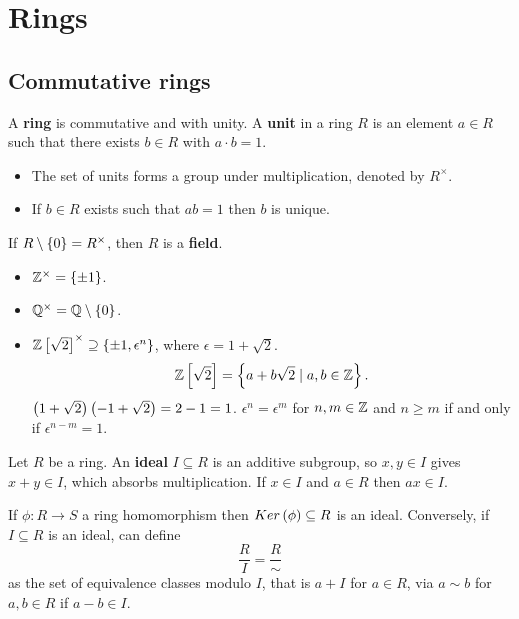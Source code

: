\pagebreak

\section{Rings}


\subsection{Commutative rings}

\begin{definition}
A \textbf{ring} is commutative and with unity. A \textbf{unit} in a ring $ R $ is an element $ a \in R $ such that there exists $ b \in R $ with $ a \cdot b = 1 $.
\begin{itemize}
\item The set of units forms a group under multiplication, denoted by $ R^\times $.
\item If $ b \in R $ exists such that $ ab = 1 $ then $ b $ is unique.
\end{itemize}
If $ R \setminus \left\{ 0 \right\} = R^\times $, then $ R $ is a \textbf{field}.
\end{definition}

\begin{example*}
\hfill
\begin{itemize}
\item $ \mathbb{Z}^\times = \left\{ \pm 1 \right\} $.
\item $ \mathbb{Q}^\times = \mathbb{Q} \setminus \left\{ 0 \right\} $.
\item $ \mathbb{Z}\left[ \sqrt{2} \right]^\times \supseteq \left\{ \pm 1, \epsilon^n \right\} $, where $ \epsilon = 1 + \sqrt{2} $.
$$ \mathbb{Z}\left[ \sqrt{2} \right] = \left\{ a + b\sqrt{2} \mid a, b \in \mathbb{Z} \right\}. $$
$ \left( 1 + \sqrt{2} \right)\left( -1 + \sqrt{2} \right) = 2 - 1 = 1 $. $ \epsilon^n = \epsilon^m $ for $ n, m \in \mathbb{Z} $ and $ n \ge m $ if and only if $ \epsilon^{n - m} = 1 $.
\end{itemize}
\end{example*}

\begin{definition}
Let $ R $ be a ring. An \textbf{ideal} $ I \subseteq R $ is an additive subgroup, so $ x, y \in I $ gives $ x + y \in I $, which absorbs multiplication. If $ x \in I $ and $ a \in R $ then $ ax \in I $.
\end{definition}

\begin{fact*}
If $ \phi : R \to S $ a ring homomorphism then $ Ker\left( \phi \right) \subseteq R $ is an ideal. Conversely, if $ I \subseteq R $ is an ideal, can define
$$ \dfrac{R}{I} = \dfrac{R}{\sim} $$
as the set of equivalence classes modulo $ I $, that is $ a + I $ for $ a \in R $, via $ a \sim b $ for $ a, b \in R $ if $ a - b \in I $.
\end{fact*}


